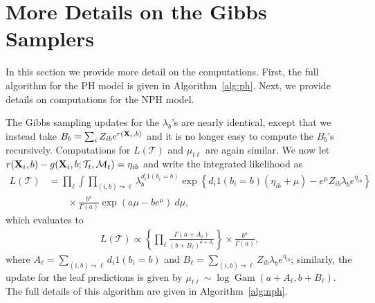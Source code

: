 \documentclass[12pt]{article}
\newcommand{\Gam}{\operatorname{Gam}}
\newcommand{\sM}{\mathcal M}
\newcommand{\Tree}{\mathcal T}
\newcommand{\bfX}{{\bf X}}
\begin{document}
\clearpage

\section{More Details on the Gibbs Samplers} \label{gibbs_ph}

In this section we provide more detail on the computations. First, the full algorithm for the PH model is given in Algorithm~\ref{alg:ph}. Next, we provide details on computations for the NPH model.

The Gibbs sampling updates for the $\lambda_b$'s are nearly identical, except that we instead take $B_b = \sum_i Z_{ib} e^{r(\bfX_i, b)}$ and it is no longer easy to compute the $B_b$'s recursively. Computations for $L(\Tree)$ and $\mu_{t\ell}$ are again similar. We now let $r(\bfX_i, b) - g(\bfX_i, b; \Tree_t, \sM_t) = \eta_{ib}$ and write the integrated likelihood as
\begin{align*}
    L(\Tree) &= \prod_\ell \int \prod_{(i,b) \leadsto \ell}
      \lambda_{b}^{d_i 1(b_i = b)} 
      \exp\left\{d_i 1(b_i = b) (\eta_{ib} + \mu)
      - e^{\mu} Z_{ib} \lambda_b e^{\eta_{ib}}\right\}
      \\&\qquad 
      \times \frac{b^a}{\Gamma(a)} \exp(a\mu - b e^\mu) \ d\mu,
\end{align*}
which evaluates to 
\begin{align*}
    L(\Tree) \propto \left\{\prod_\ell 
      \frac{\Gamma(a + A_\ell)}{(b + B_\ell)^{a + A_\ell}} \right\}
        \times \frac{b^a}{\Gamma(a)},
\end{align*}
where $A_\ell = \sum_{(i,b) \leadsto \ell} d_i 1(b_i = b)$ and $B_\ell = 
\sum_{(i,b) \leadsto \ell} Z_{ib} \lambda_b e^{\eta_{ib}}$; similarly, the 
update for the leaf predictions is given by $\mu_{t\ell} \sim \log \Gam(a + 
A_\ell, b + B_\ell)$. The full details of this algorithm are given in Algorithm~\ref{alg:nph}.
\end{document}
